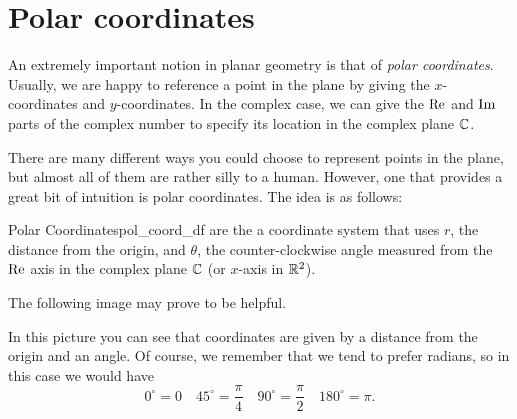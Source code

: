         \section{Polar coordinates}
        An extremely important notion in planar geometry is that of \emph{polar coordinates}. Usually, we are happy to reference a point in the plane by giving the $x$-coordinates and $y$-coordinates.  In the complex case, we can give the $\mathrm{Re}$ and $\mathrm{Im}$ parts of the complex number to specify its location in the complex plane $\mathbb{C}$.
        
        There are many different ways you could choose to represent points in the plane, but almost all of them are rather silly to a human.  However, one that provides a great bit of intuition is polar coordinates. The idea is as follows:
        
        \begin{df}{Polar Coordinates}{pol_coord_df}
         are the a coordinate system that uses $r$, the distance from the origin, and $\theta$, the counter-clockwise angle measured from the $\mathrm{Re}$ axis in the complex plane $\mathbb{C}$ (or $x$-axis in $\mathbb{R}^2$).
        \end{df}
        
        The following image may prove to be helpful.  
        
        \begin{center}
\end{center}
In this picture you can see that coordinates are given by a distance from the origin and an angle.  Of course, we remember that we tend to prefer radians, so in this case we would have
\[
0^\circ = 0 \quad 45^\circ = \frac{\pi}{4} \quad 90^\circ = \frac{\pi}{2} \quad 180^\circ = \pi.
\]

